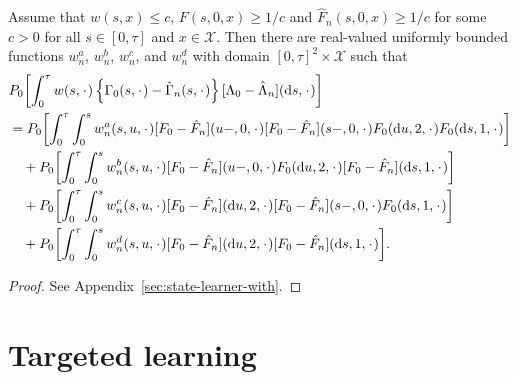 \documentclass[a4,danish]{article}
\begin{document}
\begin{proposition}
  \label{prop:dr-structure}
  Assume that \( w(s,x)\leq c \), \( F(s, 0, x) \geq 1/c \) and
  \( \hat{F}_n(s, 0, x) \geq 1/c \) for some \( c>0 \) for all
  \( s \in [0, \tau] \) and \( x \in \mathcal{X} \). Then there are real-valued
  uniformly bounded functions \( w^a_n \), \( w^b_n \), \( w^c_n \), and
  \( w^d_n \) with domain \( [0,\tau]^2 \times \mathcal{X} \) such that
  \begin{align*}
    & P_0{\left[
      \int_0^{\tau} w(s, \blank)
      \left\{
      \Gamma_0(s,\blank) -\hat{\Gamma}_n(s,\blank)
      \right\}
      [\Lambda_0-\hat{\Lambda}_n]
      (\diff s, \blank)
      \right]}
    \\
    & =
      P_0{\left[
      \int_0^{\tau} \int_0^{s} w^a_n(s,u,\blank) [F_0 - \hat{F}_n](u-, 0, \blank)[F_0 - \hat{F}_n](s-, 0, \blank) F_0(\diff u, 2, \blank ) F_0 ( \diff s, 1, \blank)
      \right]}
    \\
    & \quad +
      P_0{\left[
      \int_0^{\tau} \int_0^{s} w^b_n(s,u,\blank) [F_0 - \hat{F}_n](u-, 0, \blank)
      F_0(\diff u, 2, \blank ) [F_0 - \hat{F}_n](\diff s, 1, \blank)
      \right]}
    \\
    & \quad +
      P_0{\left[
      \int_0^{\tau} \int_0^{s} w^c_n(s,u,\blank) [F_0 - \hat{F}_n](\diff u, 2, \blank)
      [F_0 - \hat{F}_n](s-, 0, \blank)
      F_0(\diff s, 1, \blank ) 
      \right]}
    \\
    & \quad +
      P_0{\left[
      \int_0^{\tau} \int_0^{s} w^d_n(s,u,\blank) [F_0 - \hat{F}_n](\diff u, 2, \blank)
      [F_0 - \hat{F}_n](\diff s, 1, \blank)
      \right]}.
  \end{align*}
\end{proposition}
\begin{proof}
  See Appendix~\ref{sec:state-learner-with}.
\end{proof}

\section{Targeted learning}
\label{sec:targeted-learning}
\end{document}
